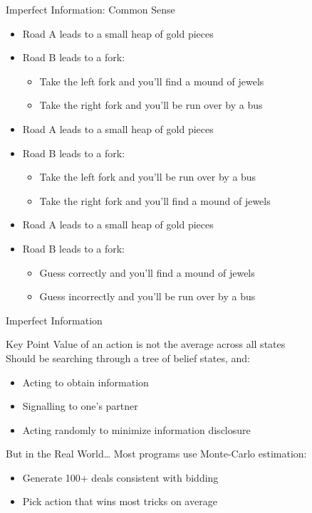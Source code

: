 \documentclass[14pt]{beamer}
\begin{document}
\begin{frame}{Imperfect Information: Common Sense}
	\begin{itemize}
		\item Road A leads to a small heap of gold pieces
		\item \alert<2->{Road B} leads to a fork:
			\begin{itemize}
				\item Take the \alert<2->{left fork} and you'll find a mound of jewels
				\item Take the right fork and you'll be run over by a bus
			\end{itemize}
	\end{itemize}
	\begin{itemize}
		\item<3-> Road A leads to a small heap of gold pieces
		\item<3-> \alert<4->{Road B} leads to a fork:
			\begin{itemize}
				\item<3-> Take the left fork and you'll be run over by a bus
				\item<3-> Take the \alert<4->{right fork} and you'll find a mound of jewels
			\end{itemize}
	\end{itemize}
	\begin{itemize}
		\item<5-> \alert<6->{Road A} leads to a small heap of gold pieces
		\item<5-> Road B leads to a fork:
			\begin{itemize}
				\item<5-> Guess correctly and you'll find a mound of jewels
				\item<5-> Guess incorrectly and you'll be run over by a bus
			\end{itemize}
	\end{itemize}
\end{frame}
\begin{frame}{Imperfect Information}
	\begin{block}{Key Point}
		Value of an action \alert{is not} the average across all states \\
		\pause
		Should be searching through a tree of \alert{belief} states, and:
		\begin{itemize}
			\item Acting to obtain information
			\item Signalling to one's partner
			\item Acting randomly to minimize information disclosure
		\end{itemize}
	\end{block}
	\pause
	\begin{block}{But in the Real World\ldots}
		Most programs use Monte-Carlo estimation:
		\begin{itemize}
			\item Generate 100+ deals consistent with bidding
			\item Pick action that wins most tricks on average
		\end{itemize}
	\end{block}
\end{frame}
\end{document}
